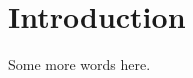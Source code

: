 \documentclass[../dissertation.tex]{\subfiles}
\begin{document}
\chapter{Introduction}
Some more words here.
\end{document}
